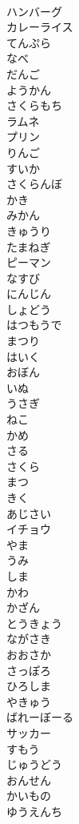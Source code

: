 \documentclass[8pt]{extreport}
\begin{document}
\begin{CJK}{UTF8}{min}
\\	ハンバーグ
\\	カレーライス
\\	てんぷら
\\	なべ
\\	だんご
\\	ようかん
\\	さくらもち
\\	ラムネ
\\	プリン
\\	りんご
\\	すいか
\\	さくらんぼ
\\	かき
\\	みかん
\\	きゅうり
\\	たまねぎ
\\	ピーマン
\\	なすび
\\	にんじん
\\	しょどう
\\	はつもうで
\\	まつり
\\	はいく
\\	おぼん
\\	いぬ
\\	うさぎ
\\	ねこ
\\	かめ
\\	さる
\\	さくら
\\	まつ
\\	きく
\\	あじさい
\\	イチョウ
\\	やま
\\	うみ
\\	しま
\\	かわ
\\	かざん
\\	とうきょう
\\	ながさき
\\	おおさか
\\	さっぽろ
\\	ひろしま
\\	やきゅう
\\	ばれーぼーる
\\	サッカー
\\	すもう
\\	じゅうどう
\\	おんせん
\\	かいもの
\\	ゆうえんち

\end{CJK}
\end{document}
